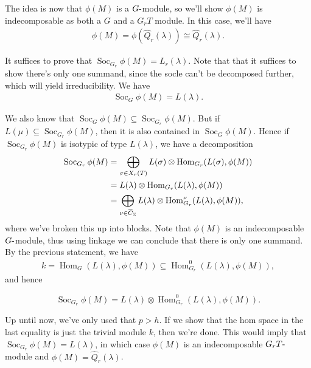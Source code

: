 The idea is now that \(\phi(M)\) is a \(G{\hbox{-}}\)module, so we'll
show \(\phi(M)\) is indecomposable as both a \(G\) and a \(G_r T\)
module. In this case, we'll have
\begin{align*}  
\phi(M) = \phi(\widehat{Q}_r(\lambda)) \cong \widehat{Q}_r(\lambda)
.\end{align*}

It suffices to prove that
\(\operatorname{Soc}_{G_r} \phi(M) = L_r(\lambda)\). Note that that it
suffices to show there's only one summand, since the socle can't be
decomposed further, which will yield irreducibility. We have
\begin{align*}  
\operatorname{Soc}_G \phi(M) = L(\lambda)
.\end{align*}

We also know that
\(\operatorname{Soc}_G \phi(M) \subseteq \operatorname{Soc}_{G_r} \phi(M)\).
But if \(L(\mu) \subseteq \operatorname{Soc}_{G_r} \phi(M)\), then it is
also contained in \(\operatorname{Soc}_G \phi(M)\). Hence if
\(\operatorname{Soc}_{G_r}\phi(M)\) is isotypic of type \(L(\lambda)\),
we have a decomposition
\begin{align*}  
\operatorname{Soc}_{G_r}\phi(M) 
&= \bigoplus_{\sigma\in X_r(T)} L(\sigma) \otimes{\operatorname{Hom}}_{G_r}(L(\sigma), \phi(M)) \\
&= L(\lambda) \otimes{\operatorname{Hom}}_{G_r}(L(\lambda), \phi(M)) \\
&= \bigoplus_{\nu\in \mkern 1.5mu\overline{\mkern-1.5muC\mkern-1.5mu}\mkern 1.5mu_{\mathbb{Z}}} L(\lambda) \otimes{\operatorname{Hom}}_{G_r}^\nu (L(\lambda), \phi(M))
,\end{align*}
where we've broken this up into blocks. Note that \(\phi(M)\) is an
indecomposable \(G{\hbox{-}}\)module, thus using linkage we can conclude
that there is only one summand. By the previous statement, we have
\begin{align*}  
k = {\operatorname{Hom}}_{G}(L(\lambda), \phi(M))
 \subseteq {\operatorname{Hom}}_{G_r}^0 (L(\lambda), \phi(M))
,\end{align*}
and hence

\begin{equation} \operatorname{Soc}_{G_r} \phi(M) = L(\lambda) \otimes{\operatorname{Hom}}_{G_r}^0 (L(\lambda), \phi(M)) .\end{equation}

\begin{remark}

Up until now, we've only used that \(p>h\). If we show that the hom
space in the last equality is just the trivial module \(k\), then we're
done. This would imply that
\(\operatorname{Soc}_{G_r} \phi(M) = L(\lambda)\), in which case
\(\phi(M)\) is an indecomposable \(G_r T{\hbox{-}}\)module and
\(\phi(M) = \widehat{Q}_r(\lambda)\).

\end{remark}

